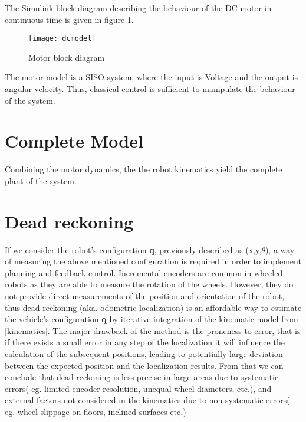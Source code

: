 The Simulink block diagram describing the behaviour of the DC motor in continuous time is given in figure \ref{fig::motor_block}.

\begin{figure}[h]
\centering
\texttt{[image: dcmodel]}
\caption{Motor block diagram}
\label{fig::motor_block}
\end{figure}

The motor model is a SISO system, where the input is Voltage and the output is angular velocity. Thus, classical control is sufficient to manipulate the behaviour of the system.  

\section{Complete Model} 

Combining the motor dynamics, the the robot kinematics yield the complete plant of the system.

\section{Dead reckoning} 

If we consider the robot's configuration \textbf{q}, previously described as (x,y,$\theta$), a way of measuring the above mentioned configuration is required in order to implement planning and feedback control. Incremental encoders are common in wheeled robots as they are able to measure the rotation of the wheels. However, they do not provide direct measurements of the position and orientation of the robot, thus dead reckoning (aka. odometric localization) is an affordable way to estimate the vehicle's configuration \textbf{q} by iterative integration of the kinematic model from \ref{kinematics}. The major drawback of the method is the proneness to error, that is if there exists a small error in any step of the localization it will influence the calculation of the subsequent positions, leading to potentially large deviation between the expected position and the localization results. From that we can conclude that dead reckoning is less precise in large areas due to systematic errors( eg. limited encoder resolution, unequal wheel diameters, etc.), and external factors not considered in the kinematics due to non-systematic errors( eg. wheel slippage on floors, inclined surfaces etc.) 

